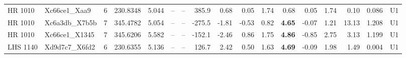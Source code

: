 \begin{tabular}{@{}l@{~}l@{~}c@{~}r@{~}r@{~}c@{~}l@{~}r@{~~}r@{~}r@{~}r@{~~}r@{~}r@{~}r@{~~}r@{~}r@{~}l@{}}
HR 1010 & Xc66ce1\_Xaa9 & 6 & 230.8348 & 5.044 & -- & -- & 385.9 & 0.68 & 0.05 & 1.74 & 0.68 & 0.05 & 1.74 & 0.10 & 0.086 & U1 \\
HR 1010 & Xc6a3db\_X7b5b & 7 & 345.4782 & 5.054 & -- & -- & -275.5 & -1.81 & -0.53 & 0.82 & \textbf{4.65} & -0.07 & 1.21 & 13.13 & 1.208 & U1 \\
HR 1010 & Xc66ce1\_X1345 & 7 & 345.6206 & 5.582 & -- & -- & -152.1 & -2.46 & 0.86 & 1.75 & \textbf{4.86} & -0.85 & 2.75 & 3.13 & 1.199 & U1 \\
LHS 1140 & Xd9d7c7\_X6fd2 & 6 & 230.6355 & 5.136 & -- & -- & 126.7 & 2.42 & 0.50 & 1.63 & \textbf{4.69} & -0.09 & 1.98 & 1.49 & 0.004 & U1 \\
\hline
\end{tabular}
